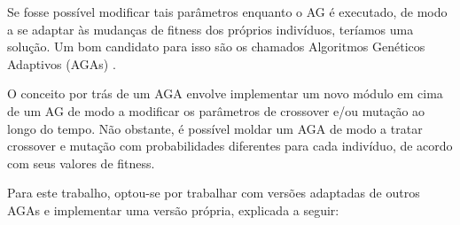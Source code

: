 Se fosse possível modificar tais parâmetros enquanto o AG é executado, de modo a se adaptar às mudanças de fitness dos próprios indivíduos, teríamos uma solução. Um bom candidato para isso são os chamados Algoritmos Genéticos Adaptivos (AGAs) \cite{srinivas1994adaptive}.

O conceito por trás de um AGA envolve implementar um novo módulo em cima de um AG de modo a modificar os parâmetros de crossover e/ou mutação ao longo do tempo. Não obstante, é possível moldar um AGA de modo a tratar crossover e mutação com probabilidades diferentes para cada indivíduo, de acordo com seus valores de fitness.

Para este trabalho, optou-se por trabalhar com versões adaptadas de outros AGAs \cite{jakobovic1999adaptive, wang2001improved, srinivas1994adaptive} e implementar uma versão própria, explicada a seguir:


